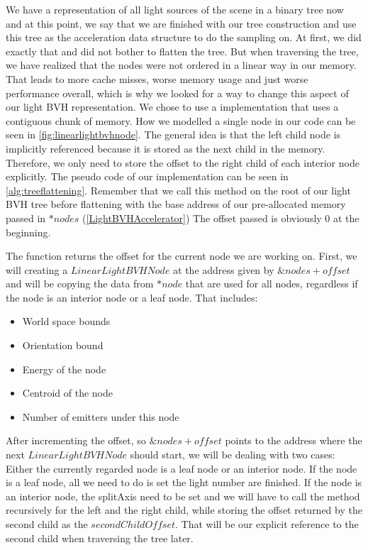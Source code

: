 We have a representation of all light sources of the scene in a binary tree now and at this point, we say that we are finished with our tree construction and use this tree as the acceleration data structure to do the sampling on. At first, we did exactly that and did not bother to flatten the tree. But when traversing the tree, we have realized that the nodes were not ordered in a linear way in our memory. That leads to more cache misses, worse memory usage and just worse performance overall, which is why we looked for a way to change this aspect of our light BVH representation. We chose to use a implementation that uses a contiguous chunk of memory. How we modelled a single node in our code can be seen in \ref{fig:linearlightbvhnode}. The general idea is that the left child node is implicitly referenced because it is stored as the next child in the memory. Therefore, we only need to store the offset to the right child of each interior node explicitly. The pseudo code of our implementation can be seen in \ref{alg:treeflattening}. Remember that we call this method on the root of our light BVH tree before flattening with the base address of our pre-allocated memory passed in $*nodes$ (\ref{LightBVHAccelerator}) The offset passed is obviously 0 at the beginning.

The function returns the offset for the current node we are working on. First, we will creating a $LinearLightBVHNode$ at the address given by $\&nodes + offset$ and will be copying the data from $*node$ that are used for all nodes, regardless if the node is an interior node or a leaf node. That includes:

\begin{itemize}
	\item World space bounds
	\item Orientation bound
	\item Energy of the node
	\item Centroid of the node
	\item Number of emitters under this node
\end{itemize} 

After incrementing the offset, so $\&nodes + offset$ points to the address where the next $LinearLightBVHNode$ should start, we will be dealing with two cases: Either the currently regarded node is a leaf node or an interior node. If the node is a leaf node, all we need to do is set the light number are finished. If the node is an interior node, the splitAxis need to be set and we will have to call the method recursively for the left and the right child, while storing the offset returned by the second child as the $secondChildOffset$. That will be our explicit reference to the second child when traversing the tree later.

